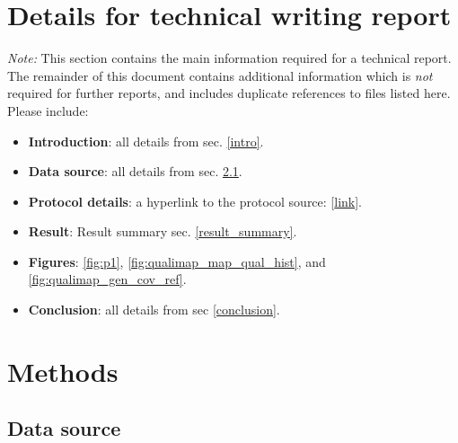 \documentclass{article}
\begin{document}


\section{Details for technical writing report}
\textit{Note:}
This section contains the main information required for a technical report.
The remainder of this document contains additional information which is \textit{not} required for further reports, and includes duplicate references to files listed here.
Please include:

\begin{itemize}
\item \textbf{Introduction}: all details from sec. \ref{intro}.
\item \textbf{Data source}: all details from sec. \ref{data_source}.
\item \textbf{Protocol details}: a hyperlink to the protocol source: [\href{https://github.com/DylanLawless/kit_assess/README.md}{link}].
\item \textbf{Result}: Result summary sec. \ref{result_summary}.
\item \textbf{Figures}: \ref{fig:p1}, \ref{fig:qualimap_map_qual_hist},  and \ref{fig:qualimap_gen_cov_ref}.
\item \textbf{Conclusion}: all details from sec \ref{conclusion}.
\end{itemize}

\section{Methods}
\subsection{Data source}
 \label{data_source}
\end{document}
